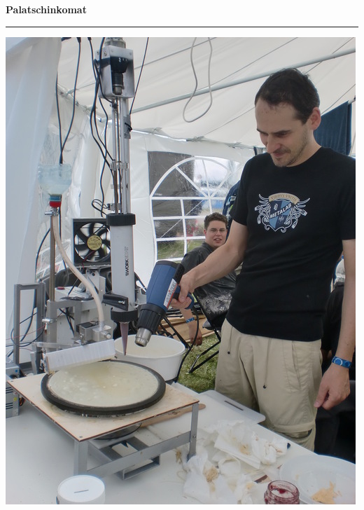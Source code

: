 \documentclass{seminar}
\providecommand{\T}[1]{
	\begin{center}
		{\bf #1}
	\end{center}
	\vspace{2mm}
	\hrule
	\vspace{2mm}
}
\begin{document}
\begin{slide}
	\T{Palatschinkomat}
	\begin{center}
		\includegraphics[scale=0.3]{palatschinkomat.jpeg}
	\end{center}
\end{slide}
\end{document}
